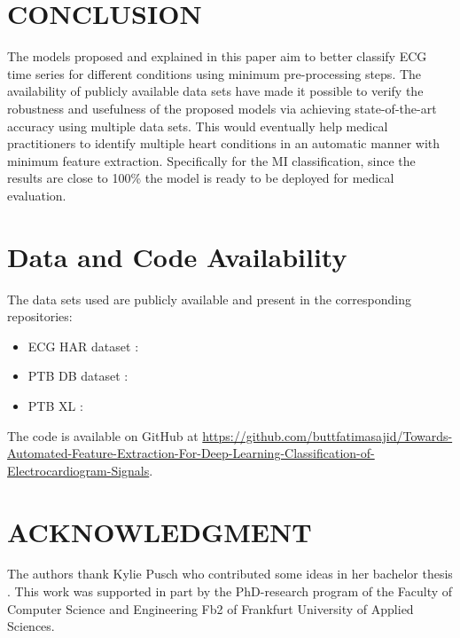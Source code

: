 \documentclass{ieeeaccess}
\begin{document}
\section{CONCLUSION}

The models proposed and explained in this paper aim to better classify ECG time series for different conditions using minimum pre-processing steps. The availability of publicly available data sets have made it possible to verify the robustness and usefulness of the proposed models via achieving state-of-the-art accuracy using multiple data sets. This would eventually help medical practitioners to identify multiple heart conditions in an automatic manner with minimum feature extraction. Specifically for the MI classification, since the results are close to 100\% the model is ready to be deployed for medical evaluation. 

\section{Data and Code Availability}
The data sets used are publicly available and present in the corresponding repositories:
\begin{itemize}
\item ECG HAR dataset : \cite{ info12020063-20}
\item PTB DB dataset : \cite{ptb}
\item PTB XL : \cite{ptbxl}
\end{itemize}

The code is available on GitHub at \url{https://github.com/buttfatimasajid/Towards-Automated-Feature-Extraction-For-Deep-Learning-Classification-of-Electrocardiogram-Signals}.

\section{ACKNOWLEDGMENT}

The authors thank Kylie Pusch who contributed some ideas in her bachelor thesis \cite{Pusch}. This work was supported in part by the PhD-research program of the Faculty of Computer Science and Engineering Fb2 of Frankfurt University of Applied Sciences.
\end{document}
